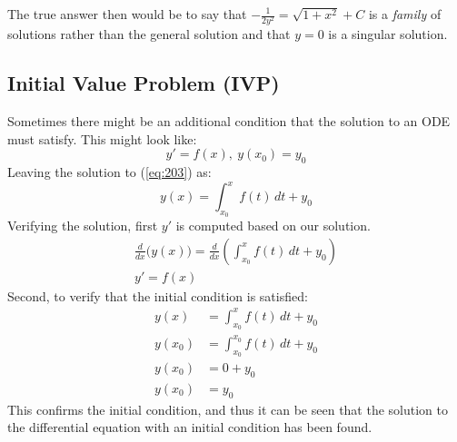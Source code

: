 \documentclass[12pt]{article}
\begin{document}
The true answer then would be to say that $-\frac{1}{2y^2} = \sqrt{1+x^2} + C$ is a \textit{family} of solutions rather than the general solution and that $y=0$ is a singular solution.

\subsection{Initial Value Problem (IVP)}
\label{ssec:initialValueProblem}
Sometimes there might be an additional condition that the solution to an ODE must satisfy. This might look like:
\begin{equation}
  y' = f(x), \ y(x_0) = y_0
  \label{eq:203}
\end{equation}
Leaving the solution to (\ref{eq:203}) as:
\begin{equation*}
  y(x) = \int_{x_0}^{x} f(t) \,dt + y_0
\end{equation*}
Verifying the solution, first $y'$ is computed based on our solution.
\begin{align*}
  \frac{d}{dx}\big(y(x)\big) = \frac{d}{dx}\left(\int_{x_0}^{x} f(t) \,dt + y_0\right) \\
  y' = f(x)
\end{align*}
Second, to verify that the initial condition is satisfied:
\begin{align*}
  y(x) &= \int_{x_0}^{x} f(t) \,dt + y_0 \\
  y(x_0) &= \int_{x_0}^{x_0} f(t) \,dt + y_0 \\
  y(x_0) &= 0 + y_0 \\
  y(x_0) &= y_0
\end{align*}
This confirms the initial condition, and thus it can be seen that the solution to the differential equation with an initial condition has been found.
\end{document}
